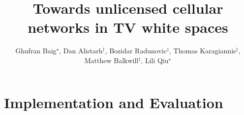\documentclass[10pt, sigconf]{acmart}
\begin{document}
\title{Towards unlicensed cellular networks in TV white spaces}

%
%
%
%
%

\author{%
Ghufran Baig$^\star$,
Dan Alistarh$^\dagger$,
Bozidar Radunovic$^\ddagger$,
Thomas Karagiannis$^\ddagger$,
Matthew Balkwill$^\ddagger$,
Lili Qiu$^\star$
%
}
 

\renewcommand{\shortauthors}{G. Baig et al.}




\maketitle











\section{Implementation and Evaluation}







%











%
\end{document}
